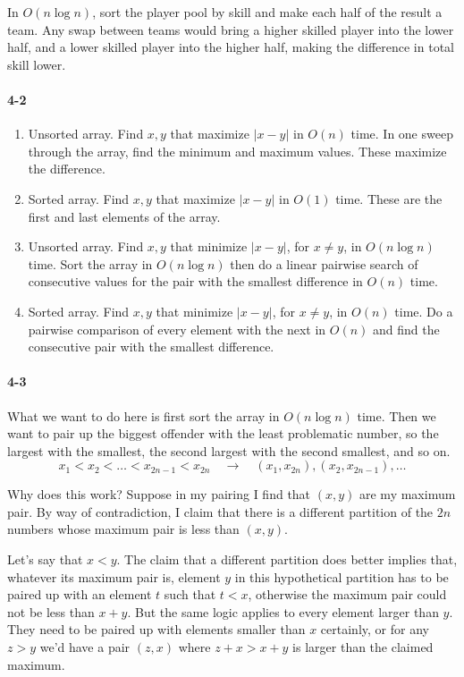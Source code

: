 \documentclass{report}
\begin{document}
In $O(n\log n)$, sort the player pool by skill and make each half of the result a team. Any swap between teams would bring a higher skilled player into the lower half, and a lower skilled player into the higher half, making the difference in total skill lower.

\paragraph{4-2}
\begin{enumerate}[label=(\alph*)]
	\item Unsorted array. Find $x, y$ that maximize $|x-y|$ in $O(n)$ time. In one sweep through the array, find the minimum and maximum values. These maximize the difference.
	\item Sorted array. Find $x, y$ that maximize $|x-y|$ in $O(1)$ time. These are the first and last elements of the array.
	\item Unsorted array. Find $x, y$ that minimize $|x-y|$, for $x\ne y$, in $O(n\log n)$ time. Sort the array in $O(n\log n)$ then do a linear pairwise search of consecutive values for the pair with the smallest difference in $O(n)$ time.
	\item Sorted array. Find $x, y$ that minimize $|x-y|$, for $x\ne y$, in $O(n)$ time. Do a pairwise comparison of every element with the next in $O(n)$ and find the consecutive pair with the smallest difference.
\end{enumerate}

\paragraph{4-3} What we want to do here is first sort the array in $O(n\log n)$ time. Then we want to pair up the biggest offender with the least problematic number, so the largest with the smallest, the second largest with the second smallest, and so on.
\[ x_1 < x_2 < \ldots < x_{2n-1} < x_{2n} \quad\to\quad (x_1, x_{2n}), (x_2, x_{2n-1}), \ldots \]

Why does this work? Suppose in my pairing I find that $(x,y)$ are my maximum pair. By way of contradiction, I claim that there is a different partition of the $2n$ numbers whose maximum pair is less than $(x,y)$.

Let's say that $x<y$. The claim that a different partition does better implies that, whatever its maximum pair is, element $y$ in this hypothetical partition has to be paired up with an element $t$ such that $t<x$, otherwise the maximum pair could not be less than $x+y$. But the same logic applies to every element larger than $y$. They need to be paired up with elements smaller than $x$ certainly, or for any $z>y$ we'd have a pair $(z,x)$ where $z+x > x+y$ is larger than the claimed maximum.
\end{document}
